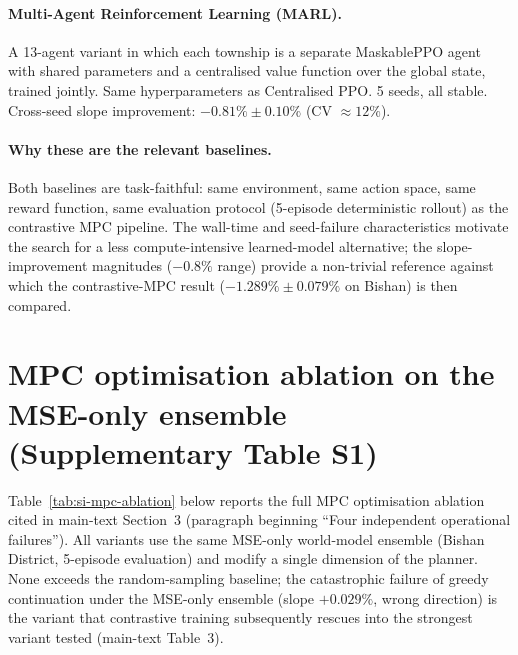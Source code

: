 \documentclass[11pt]{article}
\begin{document}
\paragraph{Multi-Agent Reinforcement Learning (MARL).} A 13-agent variant in which each township is a separate MaskablePPO agent with shared parameters and a centralised value function over the global state, trained jointly. Same hyperparameters as Centralised PPO. 5 seeds, all stable. Cross-seed slope improvement: $-0.81\% \pm 0.10\%$ (CV $\approx 12\%$).

\paragraph{Why these are the relevant baselines.} Both baselines are task-faithful: same environment, same action space, same reward function, same evaluation protocol (5-episode deterministic rollout) as the contrastive MPC pipeline. The wall-time and seed-failure characteristics motivate the search for a less compute-intensive learned-model alternative; the slope-improvement magnitudes ($-0.8\%$ range) provide a non-trivial reference against which the contrastive-MPC result ($-1.289\% \pm 0.079\%$ on Bishan) is then compared.

\section{MPC optimisation ablation on the MSE-only ensemble (Supplementary Table S1)}\label{si:s2-mpc-ablation}

Table~\ref{tab:si-mpc-ablation} below reports the full MPC optimisation ablation cited in main-text Section~3 (paragraph beginning ``Four independent operational failures''). All variants use the same MSE-only world-model ensemble (Bishan District, 5-episode evaluation) and modify a single dimension of the planner. None exceeds the random-sampling baseline; the catastrophic failure of greedy continuation under the MSE-only ensemble (slope $+0.029\%$, wrong direction) is the variant that contrastive training subsequently rescues into the strongest variant tested (main-text Table~3).
\end{document}

